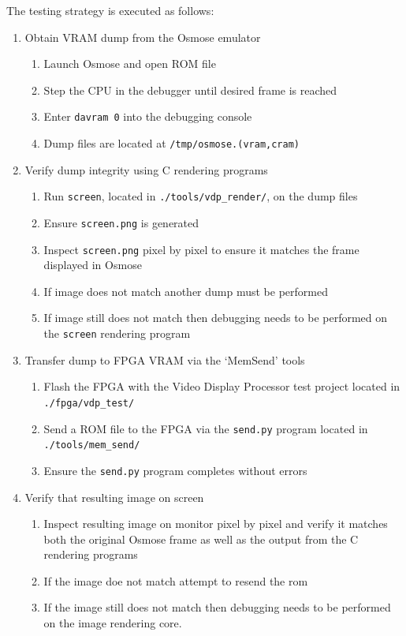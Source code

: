 \documentclass{article}
\begin{document}
The testing strategy is executed as follows:
\begin{enumerate}
    \item Obtain VRAM dump from the Osmose emulator
        \begin{enumerate}
            \item Launch Osmose and open ROM file
            \item Step the CPU in the debugger until desired frame is reached
            \item Enter \texttt{davram 0} into the debugging console
            \item Dump files are located at \texttt{/tmp/osmose.(vram,cram)}
        \end{enumerate}
    \item Verify dump integrity using C rendering programs
        \begin{enumerate}
            \item Run \texttt{screen}, located in \texttt{./tools/vdp\_render/}, on the dump files
            \item Ensure \texttt{screen.png} is generated
            \item Inspect \texttt{screen.png} pixel by pixel to ensure it matches the frame displayed in Osmose
            \item If image does not match another dump must be performed
            \item If image still does not match then debugging needs to be performed on the \texttt{screen} rendering program
        \end{enumerate}
    \item Transfer dump to FPGA VRAM via the `MemSend' tools
        \begin{enumerate}
            \item Flash the FPGA with the Video Display Processor test project located in \texttt{./fpga/vdp\_test/}
            \item Send a ROM file to the FPGA via the \texttt{send.py} program located in \texttt{./tools/mem\_send/}
            \item Ensure the \texttt{send.py} program completes without errors
        \end{enumerate}
    \item Verify that resulting image on screen
        \begin{enumerate}
            \item Inspect resulting image on monitor pixel by pixel and verify it matches both the original Osmose frame as well as the output from the C rendering programs
            \item If the image doe not match attempt to resend the rom
            \item If the image still does not match then debugging needs to be performed on the image rendering core.
        \end{enumerate}
\end{enumerate}
\end{document}
